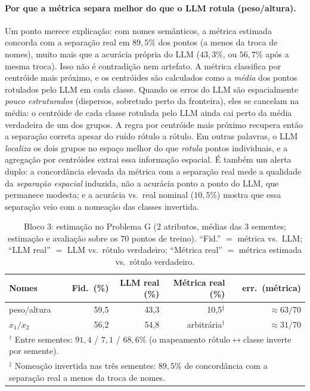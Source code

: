 \documentclass[12pt,a4paper]{article}
\begin{document}
\paragraph{Por que a métrica separa melhor do que o LLM rotula (peso/altura).}
Um ponto merece explicação: com nomes semânticos, a métrica estimada concorda com a
separação real em $89{,}5\%$ dos pontos (a menos da troca de nomes), muito mais que a
acurácia própria do LLM ($43{,}3\%$, ou $56{,}7\%$ após a mesma troca). Isso não é
contradição nem artefato. A métrica classifica por centróide mais próximo, e os centróides
são calculados como a \emph{média} dos pontos rotulados pelo LLM em cada classe. Quando os
erros do LLM são espacialmente \emph{pouco estruturados} (dispersos, sobretudo perto da
fronteira), eles se cancelam na média: o centróide de cada classe rotulada pelo LLM ainda
cai perto da média verdadeira de um dos grupos. A regra por centróide mais próximo recupera
então a separação correta apesar do ruído rótulo a rótulo. Em outras palavras, o LLM
\emph{localiza} os dois grupos no espaço melhor do que \emph{rotula} pontos individuais, e
a agregação por centróides extrai essa informação espacial. É também um alerta duplo: a
concordância elevada da métrica com a separação real mede a qualidade da \emph{separação
espacial} induzida, não a acurácia ponto a ponto do LLM, que permanece modesta; e a
acurácia vs.\ real nominal ($10{,}5\%$) mostra que essa separação veio com a nomeação das
classes invertida.

\begin{table}[ht]
\centering
\caption{Bloco 3: estimação no Problema G ($2$ atributos, médias das $3$ sementes;
estimação e avaliação sobre os $70$ pontos de treino).
``Fid.'' $=$ métrica vs.\ LLM; ``LLM real'' $=$ LLM vs.\ rótulo verdadeiro; ``Métrica real''
$=$ métrica estimada vs.\ rótulo verdadeiro.}
\label{tab:real_a}
\begin{tabular}{lrrrr}
\toprule
\textbf{Nomes} & \textbf{Fid.\ (\%)} & \textbf{LLM real (\%)} &
\textbf{Métrica real (\%)} & \textbf{err.\ (métrica)} \\
\midrule
peso/altura & 59,5 & 43,3 & 10,5$^\ddagger$ & $\approx 63/70$ \\
$x_1/x_2$   & 56,2 & 54,8 & arbitrária$^\dagger$ & $\approx 31/70$ \\
\bottomrule
\multicolumn{5}{l}{\footnotesize $^\dagger$ Entre sementes: $91{,}4$ / $7{,}1$ / $68{,}6\%$
(o mapeamento rótulo$\leftrightarrow$classe inverte por semente).} \\
\multicolumn{5}{l}{\footnotesize $^\ddagger$ Nomeação invertida nas três sementes:
$89{,}5\%$ de concordância com a separação real a menos da troca de nomes.}
\end{tabular}
\end{table}
\end{document}
